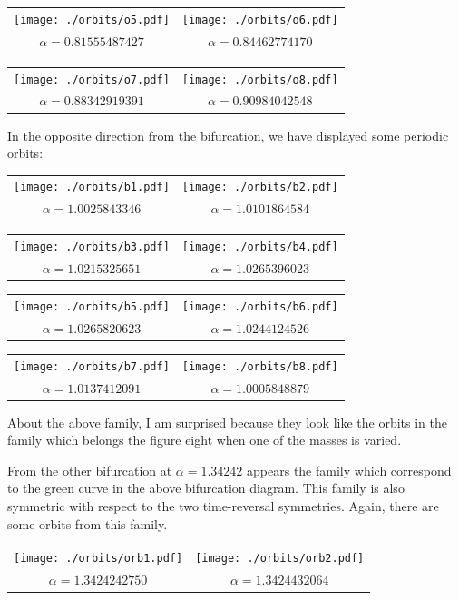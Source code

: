 \documentclass{article}
\begin{document}
\begin{tabular}{cc}
\texttt{[image: ./orbits/o5.pdf]}&
\texttt{[image: ./orbits/o6.pdf]}\\
$\alpha= 0.81555487427$&$ \alpha=0.84462774170 $
\end{tabular}

\begin{tabular}{cc}
\texttt{[image: ./orbits/o7.pdf]}&
\texttt{[image: ./orbits/o8.pdf]}\\
$\alpha=0.88342919391 $&$ \alpha=0.90984042548 $
\end{tabular}

In the opposite direction from the bifurcation, we have displayed some periodic orbits: 

\begin{tabular}{cc}
\texttt{[image: ./orbits/b1.pdf]}&
\texttt{[image: ./orbits/b2.pdf]}\\
$\alpha=1.0025843346 $&$ \alpha= 1.0101864584$
\end{tabular}

\begin{tabular}{cc}
\texttt{[image: ./orbits/b3.pdf]}&
\texttt{[image: ./orbits/b4.pdf]}\\
$\alpha= 1.0215325651$&$ \alpha= 1.0265396023$
\end{tabular}

\begin{tabular}{cc}
\texttt{[image: ./orbits/b5.pdf]}&
\texttt{[image: ./orbits/b6.pdf]}\\
$\alpha= 1.0265820623$&$ \alpha= 1.0244124526$
\end{tabular}

\begin{tabular}{cc}
\texttt{[image: ./orbits/b7.pdf]}&
\texttt{[image: ./orbits/b8.pdf]}\\
$\alpha= 1.0137412091$&$ \alpha= 1.0005848879$
\end{tabular}

About the above family, I am surprised because they look like the orbits in the family which belongs the figure eight when one of the  masses is varied. 

From the other bifurcation  at $\alpha= 1.34242$ appears the family which correspond to the green curve in the above bifurcation diagram. This family is also symmetric with respect to the two time-reversal symmetries.  Again, there are some orbits from this family.

\begin{tabular}{cc}
\texttt{[image: ./orbits/orb1.pdf]}&
\texttt{[image: ./orbits/orb2.pdf]}\\
$\alpha=1.3424242750 $&$ \alpha=1.3424432064 $
\end{tabular}
\end{document}
